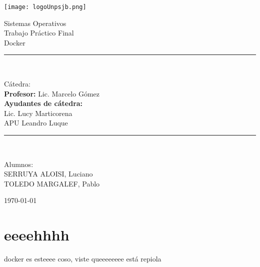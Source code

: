 \documentclass[12pt]{extarticle}
\newcommand{\fecha}{\today}
\begin{document}
    \begin{titlepage}

        \begin{center}
            \texttt{[image: logoUnpsjb.png]}
            \linebreak
            \begin{huge}
                Sistemas Operativos \\ Trabajo Práctico Final \\ Docker\\
            \end{huge}
            \vspace*{10mm}
            \rule{10cm}{0.1mm}\\
            \vspace*{3mm}
            \begin{LARGE}
                Cátedra:\\
                \textbf{Profesor:} Lic. Marcelo Gómez\\
                \vspace*{5mm}
                \textbf{Ayudantes de cátedra:}\\ Lic. Lucy Marticorena\\APU Leandro Luque\\
            \end{LARGE}
            \vspace*{3mm}
            \rule{10cm}{0.1mm}\\
            \vspace*{10mm}
            \begin{LARGE}
                Alumnos:\\
                SERRUYA ALOISI, Luciano\\
                TOLEDO MARGALEF, Pablo\\
            \end{LARGE}
            \vspace*{5mm}
            \Large\fecha
    \end{center}

    \end{titlepage}

    \clearpage
    \pagestyle{fancy}
    \cfoot{}
    \lfoot{\thepage}

    \section{eeeehhhh}
    docker es esteeee coso, viste queeeeeeee
    está repiola
\end{document}
